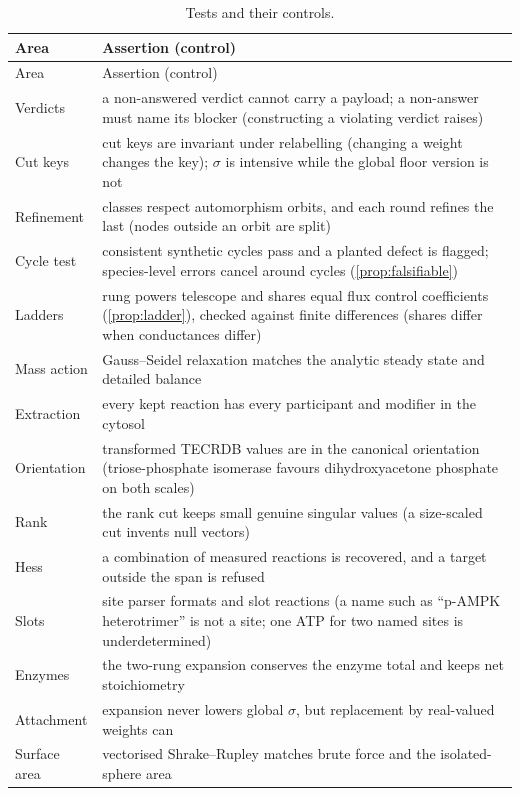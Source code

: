\begin{longtable}{@{}p{3.0cm}>{\raggedright\arraybackslash}p{11.6cm}@{}}
\caption{Tests and their controls.}\label{tab:tests}\\
\toprule
Area & Assertion (control) \\
\midrule
\endfirsthead
\toprule
Area & Assertion (control) \\
\midrule
\endhead
\bottomrule
\endfoot
Verdicts & a non-answered verdict cannot carry a payload; a non-answer must name its blocker (constructing a violating verdict raises) \\
Cut keys & cut keys are invariant under relabelling (changing a weight changes the key); $\sigma$ is intensive while the global floor version is not \\
Refinement & classes respect automorphism orbits, and each round refines the last (nodes outside an orbit are split) \\
Cycle test & consistent synthetic cycles pass and a planted defect is flagged; species-level errors cancel around cycles (\cref{prop:falsifiable}) \\
Ladders & rung powers telescope and shares equal flux control coefficients (\cref{prop:ladder}), checked against finite differences (shares differ when conductances differ) \\
Mass action & Gauss--Seidel relaxation matches the analytic steady state and detailed balance \\
Extraction & every kept reaction has every participant and modifier in the cytosol \\
Orientation & transformed TECRDB values are in the canonical orientation (triose-phosphate isomerase favours dihydroxyacetone phosphate on both scales) \\
Rank & the rank cut keeps small genuine singular values (a size-scaled cut invents null vectors) \\
Hess & a combination of measured reactions is recovered, and a target outside the span is refused \\
Slots & site parser formats and slot reactions (a name such as ``p-AMPK heterotrimer'' is not a site; one ATP for two named sites is underdetermined) \\
Enzymes & the two-rung expansion conserves the enzyme total and keeps net stoichiometry \\
Attachment & expansion never lowers global $\sigma$, but replacement by real-valued weights can \\
Surface area & vectorised Shrake--Rupley matches brute force and the isolated-sphere area \\

\end{longtable}
